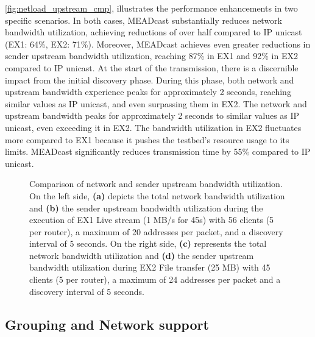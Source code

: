 \autoref{fig:netload_upstream_cmp}, illustrates the performance enhancements in
    two specific scenarios.
In both cases, MEADcast substantially reduces network bandwidth utilization,
    achieving reductions of over half compared to IP unicast (EX1: 64\%, EX2:
    71\%).
Moreover, MEADcast achieves even greater reductions in sender upstream
    bandwidth utilization, reaching 87\% in EX1 and 92\% in EX2 compared to IP
    unicast.
At the start of the transmission, there is a discernible impact from the
    initial discovery phase.
During this phase, both network and upstream bandwidth experience peaks for
    approximately 2 seconds, reaching similar values as IP unicast, and even
    surpassing them in EX2.
The network and upstream bandwidth peaks for approximately 2 seconds to similar
    values as IP unicast, even exceeding it in EX2.
The bandwidth utilization in EX2 fluctuates more compared to EX1 because it
    pushes the testbed's resource usage to its limits.
MEADcast significantly reduces transmission time by 55\% compared to IP unicast.

\begin{figure}
    \begin{center}
        
    \end{center}
    \caption[Comparison of network and sender upstream bandwidth utilization]{
        Comparison of network and sender upstream bandwidth utilization.
        On the left side, \textbf{(a)} depicts the total network bandwidth
        utilization and \textbf{(b)} the sender upstream bandwidth utilization
        during the execution of EX1 Live stream (1 MB/s for 45s) with 56 clients
        (5 per router), a maximum of 20 addresses per packet, and a discovery
        interval of 5 seconds.
        On the right side, \textbf{(c)} represents the total network bandwidth
        utilization and \textbf{(d)} the sender upstream bandwidth utilization
        during EX2 File transfer (25 MB) with 45 clients (5 per router), a
        maximum of 24 addresses per packet and a discovery interval of 5
        seconds.
    }
    \label{fig:netload_upstream_cmp}
\end{figure}



\subsection{Grouping and Network support} %
\label{sub:Results_Grouping and Network support}

